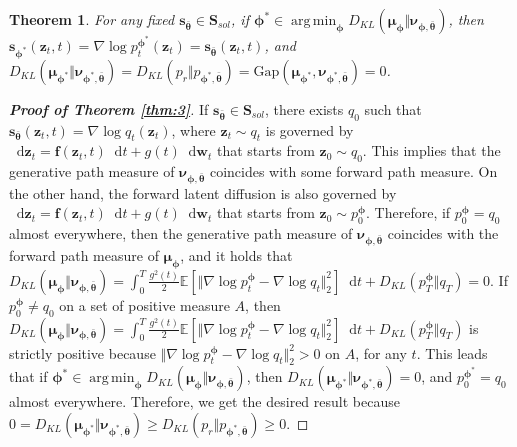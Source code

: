 \documentclass{article}
\newtheorem{theorem}{Theorem}\newtheorem{proposition}{Proposition}
\theoremstyle{definition}
\theoremstyle{remark}
\DeclareMathOperator*{\argmin}{arg\,min}
\newcommand*\diff{\mathop{}\!\mathrm{d}}
\begin{document}
	\begingroup
	\renewcommand\thetheorem{3}
	\begin{theorem}
		For any fixed $\mathbf{s}_{\bm{\bar{\theta}}}\in\mathbf{S}_{sol}$, if $\bm{\phi}^{*}\in\argmin_{\bm{\phi}}{D_{KL}(\bm{\mu}_{\bm{\phi}}\Vert \bm{\nu}_{\bm{\phi},\bm{\bar{\theta}}})}$, then $\mathbf{s}_{\bm{\phi}^{*}}(\mathbf{z}_{t},t)=\nabla\log{p_{t}^{\bm{\phi}^{*}}(\mathbf{z}_{t})}=\mathbf{s}_{\bm{\bar{\theta}}}(\mathbf{z}_{t},t)$, and $D_{KL}(\bm{\mu}_{\bm{\phi}^{*}}\Vert \bm{\nu}_{\bm{\phi}^{*},\bm{\bar{\theta}}})=D_{KL}(p_{r}\Vert p_{\bm{\phi}^{*},\bm{\bar{\theta}}})=\text{Gap}(\bm{\mu}_{\bm{\phi}^{*}},\bm{\nu}_{\bm{\phi}^{*},\bm{\bar{\theta}}})=0$.
	\end{theorem}
	\endgroup
	\begin{proof}[\textbf{Proof of Theorem \ref{thm:3}}]
		If $\mathbf{s}_{\bm{\bar{\theta}}}\in\mathbf{S}_{sol}$, there exists $q_{0}$ such that $\mathbf{s}_{\bm{\bar{\theta}}}(\mathbf{z}_{t},t)=\nabla\log{q_{t}(\mathbf{z}_{t})}$, where $\mathbf{z}_{t}\sim q_{t}$ is governed by $\diff\mathbf{z}_{t}=\mathbf{f}(\mathbf{z}_{t},t)\diff t+g(t)\diff\mathbf{w}_{t}$ that starts from $\mathbf{z}_{0}\sim q_{0}$. This implies that the generative path measure of $\bm{\nu}_{\bm{\phi},\bm{\bar{\theta}}}$ coincides with some forward path measure. On the other hand, the forward latent diffusion is also governed by $\diff\mathbf{z}_{t}=\mathbf{f}(\mathbf{z}_{t},t)\diff t+g(t)\diff\mathbf{w}_{t}$ that starts from $\mathbf{z}_{0}\sim p_{0}^{\bm{\phi}}$. Therefore, if $p_{0}^{\bm{\phi}}=q_{0}$ almost everywhere, then the generative path measure of $\bm{\nu}_{\bm{\phi},\bm{\bar{\theta}}}$ coincides with the forward path measure of $\bm{\mu}_{\bm{\phi}}$, and it holds that $D_{KL}(\bm{\mu}_{\bm{\phi}}\Vert \bm{\nu}_{\bm{\phi},\bm{\bar{\theta}}})=\int_{0}^{T}\frac{g^{2}(t)}{2}\mathbb{E}[\Vert\nabla\log{p_{t}^{\bm{\phi}}}-\nabla\log{q_{t}}\Vert_{2}^{2}]\diff t+D_{KL}(p_{T}^{\bm{\phi}}\Vert q_{T})=0$. If $p_{0}^{\bm{\phi}}\neq q_{0}$ on a set of positive measure $A$, then $D_{KL}(\bm{\mu}_{\bm{\phi}}\Vert\bm{\nu}_{\bm{\phi},\bm{\bar{\theta}}})=\int_{0}^{T}\frac{g^{2}(t)}{2}\mathbb{E}[\Vert\nabla\log{p_{t}^{\bm{\phi}}}-\nabla\log{q_{t}}\Vert_{2}^{2}]\diff t+D_{KL}(p_{T}^{\bm{\phi}}\Vert q_{T})$ is strictly positive because $\Vert\nabla\log{p_{t}^{\bm{\phi}}}-\nabla\log{q_{t}}\Vert_{2}^{2}>0$ on $A$, for any $t$. This leads that if $\bm{\phi}^{*}\in\argmin_{\bm{\phi}}{D_{KL}(\bm{\mu}_{\bm{\phi}}\Vert \bm{\nu}_{\bm{\phi},\bm{\bar{\theta}}})}$, then $D_{KL}(\bm{\mu}_{\bm{\phi}^{*}}\Vert \bm{\nu}_{\bm{\phi}^{*},\bm{\bar{\theta}}})= 0$, and $p_{0}^{\bm{\phi}^{*}}=q_{0}$ almost everywhere. Therefore, we get the desired result because $0=D_{KL}(\bm{\mu}_{\bm{\phi}^{*}}\Vert\bm{\nu}_{\bm{\phi}^{*},\bm{\bar{\theta}}})\ge D_{KL}(p_{r}\Vert p_{\bm{\phi}^{*},\bm{\bar{\theta}}})\ge 0$.
	\end{proof}
	
\end{document}
